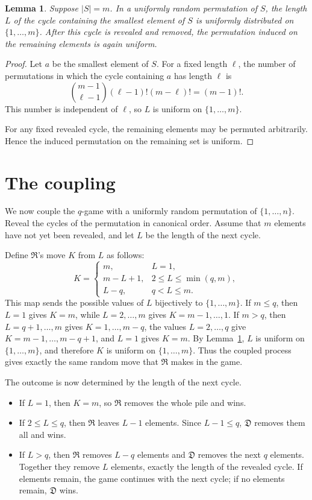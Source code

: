 \documentclass{article}
\newcommand{\Rplayer}{\mathfrak{R}}
\newcommand{\Dplayer}{\mathfrak{D}}
\newtheorem{lemma}{Lemma}
\begin{document}
\begin{lemma}
\label{lem:uniform-cycle-length}
Suppose $|S|=m$. In a uniformly random permutation of $S$, the length $L$ of
the cycle containing the smallest element of $S$ is uniformly distributed on
$\{1,\ldots,m\}$. After this cycle is revealed and removed, the permutation
induced on the remaining elements is again uniform.
\end{lemma}

\begin{proof}
Let $a$ be the smallest element of $S$. For a fixed length $\ell$, the number
of permutations in which the cycle containing $a$ has length $\ell$ is
\[
    \binom{m-1}{\ell-1}(\ell-1)!(m-\ell)!=(m-1)!.
\]
This number is independent of $\ell$, so $L$ is uniform on
$\{1,\ldots,m\}$.

For any fixed revealed cycle, the remaining elements may be permuted
arbitrarily. Hence the induced permutation on the remaining set is uniform.
\end{proof}

\section{The coupling}

We now couple the $q$-game with a uniformly random permutation of
$\{1,\ldots,n\}$. Reveal the cycles of the permutation in canonical order.
Assume that $m$ elements have not yet been revealed, and let $L$ be the length
of the next cycle.

Define $\Rplayer$'s move $K$ from $L$ as follows:
\[
K=
\begin{cases}
m, & L=1,\\
m-L+1, & 2\le L\le \min(q,m),\\
L-q, & q<L\le m.
\end{cases}
\]
This map sends the possible values of $L$ bijectively to
$\{1,\ldots,m\}$. If $m\le q$, then $L=1$ gives $K=m$, while
$L=2,\ldots,m$ gives $K=m-1,\ldots,1$. If $m>q$, then
$L=q+1,\ldots,m$ gives $K=1,\ldots,m-q$, the values
$L=2,\ldots,q$ give $K=m-1,\ldots,m-q+1$, and $L=1$ gives
$K=m$. By Lemma~\ref{lem:uniform-cycle-length}, $L$ is uniform on
$\{1,\ldots,m\}$, and therefore $K$ is uniform on $\{1,\ldots,m\}$. Thus the
coupled process gives exactly the same random move that $\Rplayer$ makes in
the game.

The outcome is now determined by the length of the next cycle.

\begin{itemize}
\item If $L=1$, then $K=m$, so $\Rplayer$ removes the whole pile and wins.
\item If $2\le L\le q$, then $\Rplayer$ leaves $L-1$ elements. Since
      $L-1\le q$, $\Dplayer$ removes them all and wins.
\item If $L>q$, then $\Rplayer$ removes $L-q$ elements and $\Dplayer$ removes
      the next $q$ elements. Together they remove $L$ elements, exactly the
      length of the revealed cycle. If elements remain, the game continues
      with the next cycle; if no elements remain, $\Dplayer$ wins.
\end{itemize}
\end{document}
